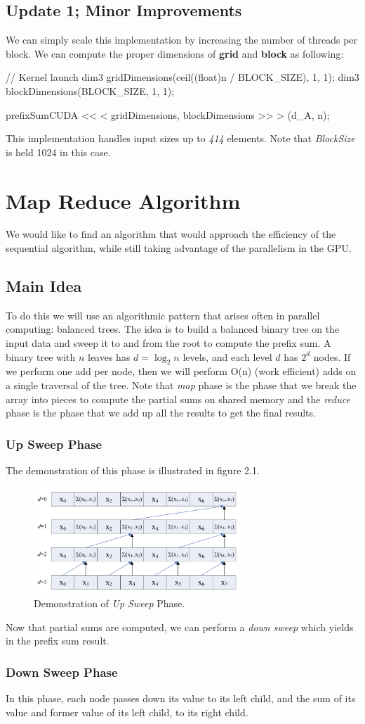 \documentclass[12pt]{article}
\numberwithin{equation}{section}
\numberwithin{table}{section}
\numberwithin{figure}{section}
\begin{document}
\subsection{Update 1; Minor Improvements}
We can simply scale this implementation by increasing the number of threads per block. We can compute the proper dimensions of \textbf{grid} and \textbf{block} as following:
\begin{cpp}
	// Kernel launch 
	dim3 gridDimensions(ceil((float)n / BLOCK_SIZE), 1, 1);
	dim3 blockDimensions(BLOCK_SIZE, 1, 1);
	
	prefixSumCUDA << < gridDimensions, blockDimensions >> > (d_A, n);
\end{cpp}
This implementation handles input sizes up to \textit{414} elements. Note that \textit{BlockSize} is held 1024 in this case.

\section{Map Reduce Algorithm}
We would like to find an algorithm that would approach the efficiency of the sequential algorithm, while still taking advantage of the parallelism in the GPU.

\subsection{Main Idea}
To do this we will use an algorithmic pattern that arises often in parallel computing: balanced trees. The idea is to build a balanced binary tree on the input data and sweep it to and from the root to compute the prefix sum. A binary tree with $n$ leaves has $d = \log_2 n$ levels, and each level $d$ has $2^d$ nodes. If we perform one add per node, then we will perform O(n) (work efficient) adds on a single traversal of the tree. Note that \textit{map} phase is the phase that we break the array into pieces to compute the partial sums on shared memory and the \textit{reduce} phase is the phase that we add up all the results to get the final results.

\subsubsection{Up Sweep Phase}
The demonstration of this phase is illustrated in figure 2.1.
\begin{figure}[!h]\centering
	\includegraphics[width=0.7\textwidth]{2_1.png}
	\caption{Demonstration of \textit{Up Sweep} Phase.}
	\label{pl1}
\end{figure}
Now that partial sums are computed, we can perform a \textit{down sweep} which yields in the prefix sum result.

\subsubsection{Down Sweep Phase}
In this phase, each node passes down its value to its left child, and the sum of its value and former value of its left child, to its right child.
\end{document}
